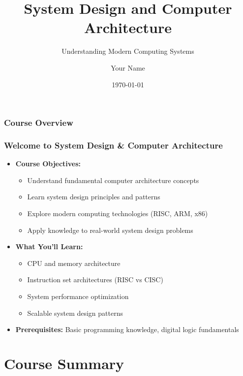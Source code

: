 \documentclass[aspectratio=169,xcolor=dvipsnames]{beamer}
\title[System Design \& Computer Architecture]{System Design and Computer Architecture}
\subtitle{Understanding Modern Computing Systems}
\author[Your Name]{Your Name}
\institute[Institution]{
    Department of Computer Science\\
    Your Institution
}
\date{\today}
\begin{document}
\begin{frame}
    \titlepage
\end{frame}

\begin{frame}
    \frametitle{Course Overview}
    \tableofcontents
\end{frame}

\begin{frame}
    \frametitle{Welcome to System Design \& Computer Architecture}
    \begin{itemize}
        \item \textbf{Course Objectives:}
        \begin{itemize}
            \item Understand fundamental computer architecture concepts
            \item Learn system design principles and patterns
            \item Explore modern computing technologies (RISC, ARM, x86)
            \item Apply knowledge to real-world system design problems
        \end{itemize}
        \item \textbf{What You'll Learn:}
        \begin{itemize}
            \item CPU and memory architecture
            \item Instruction set architectures (RISC vs CISC)
            \item System performance optimization
            \item Scalable system design patterns
        \end{itemize}
        \item \textbf{Prerequisites:} Basic programming knowledge, digital logic fundamentals
    \end{itemize}
\end{frame}



% 
% 
% 
% 
% 

\section{Course Summary}
\end{document}
